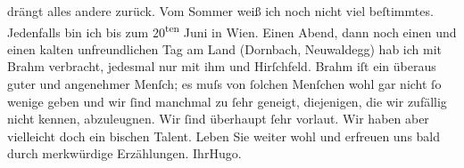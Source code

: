 \begin{ledgroupsized}[t]{13cm}
                    drängt alles andere zurück.\pend
           \pstart
           Vom Sommer weiß ich noch nicht viel beſtimmtes. Jedenfalls bin ich bis zum
                            20\textsuperscript{ten} Juni in Wien. Einen Abend, dann noch einen und einen kalten
                    unfreundlichen Tag am Land (Dornbach, Neuwaldegg) hab ich mit Brahm verbracht, jedesmal {\pb}nur mit ihm und Hirſchfeld. Brahm iſt ein überaus guter und angenehmer Menſch; es muſs von ſolchen
                    Menſchen wohl gar nicht ſo wenige geben und wir ſind manchmal zu ſehr geneigt,
                    diejenigen, die wir zufällig nicht kennen, abzuleugnen. Wir ſind überhaupt ſehr
                    vorlaut. Wir haben aber vielleicht doch ein bischen Talent.\pend
           \pstart
           Leben Sie weiter wohl und erfreuen uns bald durch merkwürdige Erzählungen.\pend
           \pstart Ihr\spacefill\mbox{Hugo.}\pend{}\endnumbering{}\end{ledgroupsized}  \newcommand{\dateiname}{L00677}\newcommand{\titel}{Hugo von Hofmannsthal an Arthur Schnitzler, 17. 5. [1897]}\newcommand{\editorInnen}{Martin Anton Müller und Gerd-Hermann Susen}
      